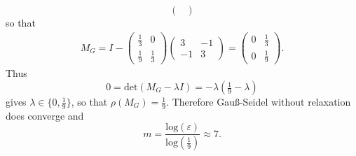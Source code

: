 {$$\begin{pmatrix}
\end{pmatrix}  $$
so that
\begin{align*}
	M_G 
	= I-\begin{pmatrix}
		\tfrac{1}{3}&0\\\tfrac{1}{9}&\tfrac{1}{3}
	\end{pmatrix}
	\begin{pmatrix}
		3&-1\\-1&3
	\end{pmatrix}
	=
	\begin{pmatrix}
		0&\tfrac{1}{3}\\0&\tfrac{1}{9}
	\end{pmatrix}.
\end{align*}
Thus 
$$0 = \text{det}(M_G -\lambda I) = -\lambda (\tfrac{1}{9}-\lambda)$$
gives $\lambda \in \{0, \tfrac{1}{9}\}$, so that $\rho(M_G) = \tfrac{1}{9}$. Therefore Gauß-Seidel without relaxation does converge and 
$$m =\frac{ \text{log}(\varepsilon)}{ \text{log}(\tfrac{1}{9})}\approx 7. $$
}
